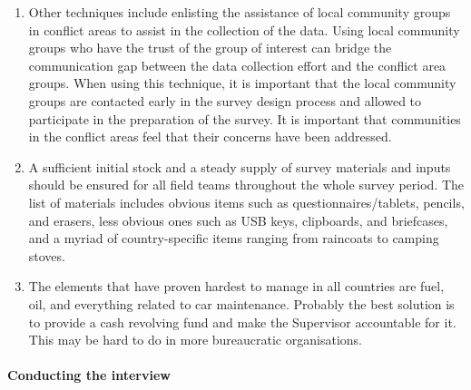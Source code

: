 \documentclass[
]{article}
\begin{document}
\begin{enumerate}
\item
  Other techniques include enlisting the assistance of local
  community groups in conflict areas to assist in the collection of
  the data. Using local community groups who have the trust of the
  group of interest can bridge the communication gap between the data
  collection effort and the conflict area groups. When using this
  technique, it is important that the local community groups are
  contacted early in the survey design process and allowed to
  participate in the preparation of the survey. It is important that
  communities in the conflict areas feel that their concerns have been
  addressed.
\item
  A sufficient initial stock and a steady supply of survey materials
  and inputs should be ensured for all field teams throughout the
  whole survey period. The list of materials includes obvious items
  such as questionnaires/tablets, pencils, and erasers, less obvious
  ones such as USB keys, clipboards, and briefcases, and a myriad of
  country-specific items ranging from raincoats to camping stoves.
\item
  The elements that have proven hardest to manage in all countries
  are fuel, oil, and everything related to car maintenance. Probably
  the best solution is to provide a cash revolving fund and make the
  Supervisor accountable for it. This may be hard to do in more
  bureaucratic organisations.
\end{enumerate}

\hypertarget{conducting-the-interview-1}{%
\paragraph{Conducting the interview}\label{conducting-the-interview-1}}
\end{document}
